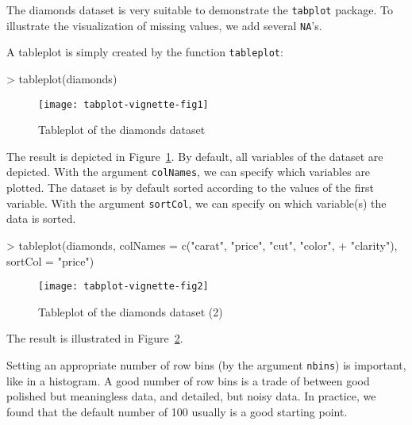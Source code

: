 \documentclass[11pt, fleqn, a4paper]{article}
\begin{document}
The diamonds dataset is very suitable to demonstrate the {\tt tabplot} package. To illustrate the visualization of missing values, we add several {\tt NA}'s.

\begin{Schunk}
\end{Schunk}

A tableplot is simply created by the function {\tt tableplot}:
\begin{Schunk}
\begin{Sinput}
> tableplot(diamonds)
\end{Sinput}
\end{Schunk}

\begin{figure}[htp]
\begin{center}
\texttt{[image: tabplot-vignette-fig1]}
\end{center}
\caption{Tableplot of the diamonds dataset}
\label{fig:tp1}
\end{figure}

The result is depicted in Figure~\ref{fig:tp1}. By default, all variables of the dataset are depicted. With the argument {\tt colNames}, we can specify which variables are plotted. The dataset is by default sorted according to the values of the first variable. With the argument {\tt sortCol}, we can specify on which variable(s) the data is sorted.

\begin{Schunk}
\begin{Sinput}
> tableplot(diamonds, colNames = c("carat", "price", "cut", "color", 
+     "clarity"), sortCol = "price")
\end{Sinput}
\end{Schunk}

\begin{figure}[htp]
\begin{center}
\texttt{[image: tabplot-vignette-fig2]}
\end{center}
\caption{Tableplot of the diamonds dataset (2)}
\label{fig:tp2}
\end{figure}

The result is illustrated in Figure~\ref{fig:tp2}. 

Setting an appropriate number of row bins (by the argument {\tt nbins}) is important, like in a histogram. A good number of row bins is a trade of between good polished but meaningless data, and detailed, but noisy data. In practice, we found that the default number of 100 usually is a good starting point.
\end{document}
